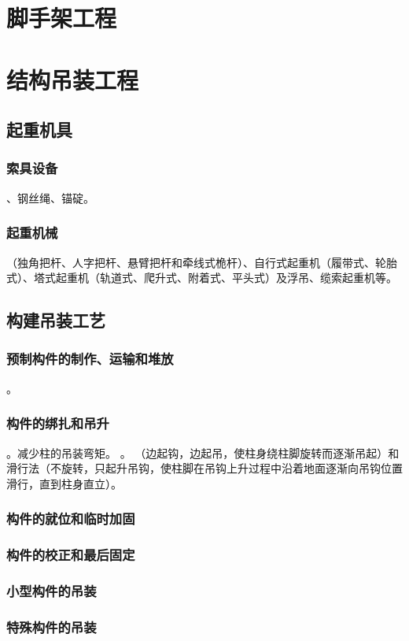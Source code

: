 \documentclass{book}
\begin{document}
\chapter{脚手架工程}
\chapter{结构吊装工程}
\section{起重机具}
\subsection{索具设备}
、钢丝绳、锚碇。
\subsection{起重机械}
（独角把杆、人字把杆、悬臂把杆和牵线式桅杆）、自行式起重机（履带式、轮胎式）、塔式起重机（轨道式、爬升式、附着式、平头式）及浮吊、缆索起重机等。
\section{构建吊装工艺}
\subsection{预制构件的制作、运输和堆放}
。
\subsection{构件的绑扎和吊升}
。减少柱的吊装弯矩。
。
（边起钩，边起吊，使柱身绕柱脚旋转而逐渐吊起）和滑行法（不旋转，只起升吊钩，使柱脚在吊钩上升过程中沿着地面逐渐向吊钩位置滑行，直到柱身直立）。
\subsection{构件的就位和临时加固}
\subsection{构件的校正和最后固定}
\subsection{小型构件的吊装}
\subsection{特殊构件的吊装}
\end{document}
